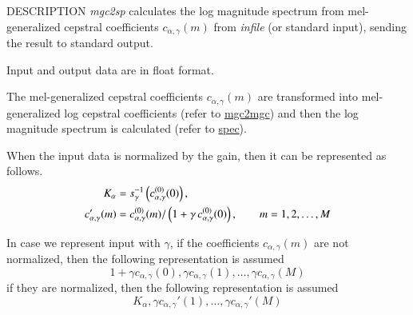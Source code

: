 \begin{qsection}{DESCRIPTION}
{\em mgc2sp} calculates the log magnitude spectrum 
from mel-generalized cepstral coefficients $c_{\alpha, \gamma}(m)$
from {\em infile} (or standard input),
sending the result to standard output.

Input and output data are in float format.

The mel-generalized cepstral coefficients $c_{\alpha, \gamma}(m)$
are transformed into mel-generalized log cepstral coefficients
(refer to \hyperlink{mgc2mgc}{mgc2mgc})
and then the log magnitude spectrum is calculated 
(refer to \hyperlink{spec}{spec}).

When the input data is normalized by the gain,
then it can be represented as follows.
\begin{align}
K_{\alpha} &= 
	s_{\gamma}^{-1}\left(c_{\alpha,\gamma}^{(0)}(0)\right), \notag \\
c_{\alpha,\gamma}'(m) &=
          c_{\alpha,\gamma}^{(0)}(m)/\left(1+\gamma\,
	  c_{\alpha,\gamma}^{(0)}(0)\right), \qquad m = 1,2,\dots, M \notag
\end{align}

In case we represent input with $\gamma$,
if the coefficients $c_{\alpha,\gamma}(m)$ are not normalized, then
the following representation is assumed
\begin{displaymath}
1+\gamma c_{\alpha,\gamma}(0), \gamma c_{\alpha,\gamma}(1), \dots, \gamma c_{\alpha,\gamma}(M)
\end{displaymath}
if they are normalized, then
the following representation is assumed
\begin{displaymath}
K_\alpha,\gamma c_{\alpha,\gamma}'(1),\dots, \gamma c_{\alpha,\gamma}'(M)
\end{displaymath}

\end{qsection}

